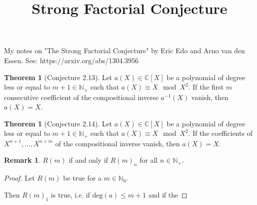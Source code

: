 \documentclass[a4paper]{article}
\title{Strong Factorial Conjecture}
\theoremstyle{definition}
\newtheorem{theorem}[definition]{Theorem}
\newtheorem*{remark}{Remark}
\begin{document}

My notes on "The Strong Factorial Conjecture" by Eric Edo and Arno van den Essen. See: https://arxiv.org/abs/1304.3956

\begin{theorem}[Conjecture 2.13]
    Let \(a(X) \in \mathbb{C}[X]\) be a polynomial of degree less or equal to \(m + 1 \in \mathbb{N}_+\) such that \(a(X) \equiv X \mod{X^2}\). If the first \(m\) consecutive coefficient of the compositional inverse \(a^{-1}(X)\) vanish, then \(a(X) = X\).
\end{theorem}

\begin{theorem}[Conjecture 2.14]
    Let \(a(X) \in \mathbb{C}[X]\) be a polynomial of degree less or equal to \(m + 1 \in \mathbb{N}_+\) such that \(a(X) \equiv X \mod{X^2}\). If the coefficients of \(X^{n+1}, \ldots, X^{n+m}\) of the compositional inverse vanish, then \(a(X) = X\).
\end{theorem}

\begin{remark}
    \(R(m)\) if and only if \(R(m)_n\) for all \(n \in \mathbb{N}_+\).
\end{remark}

\begin{proof}
    Let \(R(m)\) be true for a \(m \in \mathbb{N}_0\).

    Then \(R(m)_1\) is true, i.e. if \(\text{deg}(a) \leq m + 1\) and if the
\end{proof}
\end{document}
